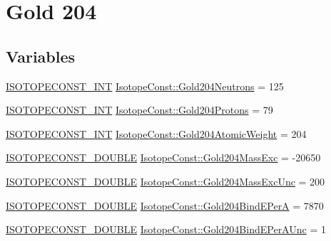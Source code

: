 \hypertarget{group___isotope_const-_gold-_au204}{}\section{Gold 204}
\label{group___isotope_const-_gold-_au204}
\subsection*{Variables}
\begin{DoxyCompactItemize}
\item 
\mbox{\hyperlink{group___isotope_const-_macros_ga5f18360b3e99483a35c32d789e62621c}{I\+S\+O\+T\+O\+P\+E\+C\+O\+N\+S\+T\+\_\+\+I\+NT}} \mbox{\hyperlink{group___isotope_const-_gold-_au204_ga35cfac1af35590493f10d6bda160b97a}{Isotope\+Const\+::\+Gold204\+Neutrons}} = 125
\item 
\mbox{\hyperlink{group___isotope_const-_macros_ga5f18360b3e99483a35c32d789e62621c}{I\+S\+O\+T\+O\+P\+E\+C\+O\+N\+S\+T\+\_\+\+I\+NT}} \mbox{\hyperlink{group___isotope_const-_gold-_au204_ga631e669367cefea4c8fb3e12d971a54b}{Isotope\+Const\+::\+Gold204\+Protons}} = 79
\item 
\mbox{\hyperlink{group___isotope_const-_macros_ga5f18360b3e99483a35c32d789e62621c}{I\+S\+O\+T\+O\+P\+E\+C\+O\+N\+S\+T\+\_\+\+I\+NT}} \mbox{\hyperlink{group___isotope_const-_gold-_au204_gaae7b354b03e0511dec511a666583f4b7}{Isotope\+Const\+::\+Gold204\+Atomic\+Weight}} = 204
\item 
\mbox{\hyperlink{group___isotope_const-_macros_ga8f45a7272ce02c0b4c65c44636ed719a}{I\+S\+O\+T\+O\+P\+E\+C\+O\+N\+S\+T\+\_\+\+D\+O\+U\+B\+LE}} \mbox{\hyperlink{group___isotope_const-_gold-_au204_ga1d04f4f8687e8c0db63713f09e1e66e5}{Isotope\+Const\+::\+Gold204\+Mass\+Exc}} = -\/20650
\item 
\mbox{\hyperlink{group___isotope_const-_macros_ga8f45a7272ce02c0b4c65c44636ed719a}{I\+S\+O\+T\+O\+P\+E\+C\+O\+N\+S\+T\+\_\+\+D\+O\+U\+B\+LE}} \mbox{\hyperlink{group___isotope_const-_gold-_au204_gabc42d40e8825f8f6f45f86513fabd00b}{Isotope\+Const\+::\+Gold204\+Mass\+Exc\+Unc}} = 200
\item 
\mbox{\hyperlink{group___isotope_const-_macros_ga8f45a7272ce02c0b4c65c44636ed719a}{I\+S\+O\+T\+O\+P\+E\+C\+O\+N\+S\+T\+\_\+\+D\+O\+U\+B\+LE}} \mbox{\hyperlink{group___isotope_const-_gold-_au204_ga608899244534c1861874cf9b6551f3b3}{Isotope\+Const\+::\+Gold204\+Bind\+E\+PerA}} = 7870
\item 
\mbox{\hyperlink{group___isotope_const-_macros_ga8f45a7272ce02c0b4c65c44636ed719a}{I\+S\+O\+T\+O\+P\+E\+C\+O\+N\+S\+T\+\_\+\+D\+O\+U\+B\+LE}} \mbox{\hyperlink{group___isotope_const-_gold-_au204_gaa714231bda7e522428846a7fbbf94a19}{Isotope\+Const\+::\+Gold204\+Bind\+E\+Per\+A\+Unc}} = 1

\end{DoxyCompactItemize}
